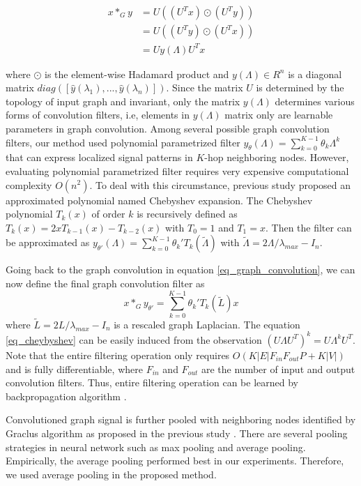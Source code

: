 \documentclass{article}
\begin{document}
\begin{align}
\label{eq_graph_convolution}
x*_{G}y & = U( (U^Tx) \odot (U^Ty)) \nonumber \\
& = U ( (U^Ty) \odot (U^Tx)) \nonumber \\
& = U y(\Lambda) U^Tx
\end{align}

\noindent where $\odot$ is the element-wise Hadamard product and $y(\Lambda) \in R^n$ is a diagonal matrix $diag([\hat{y}(\lambda_1),...,\hat{y}(\lambda_n)])$. Since the matrix $U$ is determined by the topology of input graph and invariant, only the matrix $y(\Lambda)$ determines various forms of convolution filters, i.e, elements in $y(\Lambda)$ matrix only are learnable parameters in graph convolution.
Among several possible graph convolution filters, our method used polynomial parametrized filter $y_{\theta}(\Lambda) = \sum_{k=0}^{K-1}\theta_{k}\Lambda^{k}$ that can express localized signal patterns in $K$-hop neighboring nodes.
However, evaluating polynomial parametrized filter requires very expensive computational complexity $O(n^2)$. To deal with this circumstance, previous study \cite{hammond2011wavelets} proposed an approximated polynomial named Chebyshev expansion. The Chebyshev polynomial $T_k(x)$ of order $k$ is recursively defined as $T_k(x) = 2xT_{k-1}(x) - T_{k-2}(x)$ with $T_0 = 1$ and $T_1 = x$. Then the filter can be approximated as $y_{\theta'}(\Lambda) = \sum_{k=0}^{K-1} \theta_k'T_k(\tilde{\Lambda})$ with $\tilde{\Lambda} = 2\Lambda/\lambda_{max} - I_n$.

Going back to the graph convolution in equation \ref{eq_graph_convolution}, we can now define the final graph convolution filter as
\begin{equation}
\label{eq_cheybyshev}
x*_Gy_{\theta'} = \sum_{k=0}^{K-1}\theta_k'T_k(\tilde{L})x
\end{equation}
\noindent where $\tilde{L} = 2L/\lambda_{max} - I_n$ is a rescaled graph Laplacian. The equation \ref{eq_cheybyshev} can be easily induced from the observation $(U\Lambda U^T)^k = U\Lambda^kU^T$. Note that the entire filtering operation only requires $O(K|E|F_{in}F_{out}P + K|V|)$ and is fully differentiable, where $F_{in}$ and $F_{out}$ are the number of input and output convolution filters. Thus, entire filtering operation can be learned by backpropagation algorithm \cite{defferrard2016convolutional}.

Convolutioned graph signal is further pooled with neighboring nodes identified by Graclus algorithm \cite{dhillon2007weighted} as proposed in the previous study \cite{defferrard2016convolutional}. There are several pooling strategies in neural network such as max pooling and average pooling. Empirically, the average pooling performed best in our experiments. Therefore, we used average pooling in the proposed method.
\end{document}
